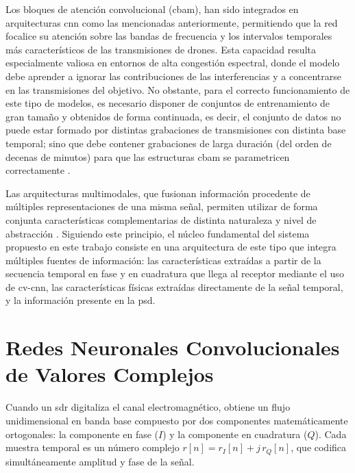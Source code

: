 Los bloques de atención convolucional (\gls{cbam}), han sido integrados en arquitecturas \gls{cnn} como las mencionadas anteriormente, permitiendo que la red focalice su atención sobre las bandas de frecuencia y los intervalos temporales más característicos de las transmisiones de drones. Esta capacidad resulta especialmente valiosa en entornos de alta congestión espectral, donde el modelo debe aprender a ignorar las contribuciones de las interferencias y a concentrarse en las transmisiones del objetivo. No obstante, para el correcto funcionamiento de este tipo de modelos, es necesario disponer de conjuntos de entrenamiento de gran tamaño y obtenidos de forma continuada, es decir, el conjunto de datos no puede estar formado por distintas grabaciones de transmisiones con distinta base temporal; sino que debe contener grabaciones de larga duración (del orden de decenas de minutos) para que las estructuras \gls{cbam} se parametricen correctamente \cite{woo_cbam_2018}.

Las arquitecturas multimodales, que fusionan información procedente de múltiples representaciones de una misma señal, permiten utilizar de forma conjunta características complementarias de distinta naturaleza y nivel de abstracción \cite{baltrusaitis_multimodal_2018}. Siguiendo este principio, el núcleo fundamental del sistema propuesto en este trabajo consiste en una arquitectura de este tipo que integra múltiples fuentes de información: las características extraídas a partir de la secuencia temporal en fase y en cuadratura que llega al receptor mediante el uso de \gls{cv-cnn}, las características físicas extraídas directamente de la señal temporal, y la información presente en la \gls{psd}.

\section{Redes Neuronales Convolucionales de Valores Complejos}
\label{sec:redes_complejas}

Cuando un \gls{sdr} digitaliza el canal electromagnético, obtiene un flujo unidimensional en banda base compuesto por dos componentes matemáticamente ortogonales: la componente en fase ($I$) y la componente en cuadratura ($Q$). Cada muestra temporal es un número complejo $r[n] = r_I[n] + j\,r_Q[n]$, que codifica simultáneamente amplitud y fase de la señal.


